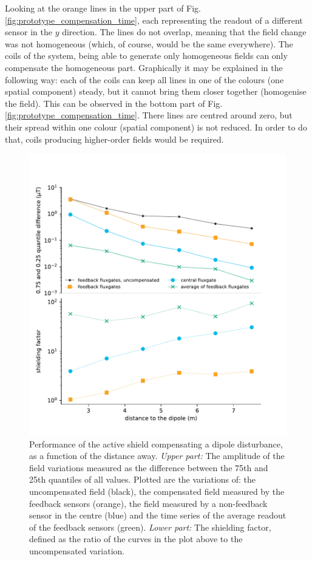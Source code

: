Looking at the orange lines in the upper part of Fig.\,\ref{fig:prototype_compensation_time}, each representing the readout of a different sensor in the $y$ direction.
The lines do not overlap, meaning that the field change was not homogeneous (which, of course, would be the same everywhere).
The coils of the system, being able to generate only homogeneous fields can only compensate the homogeneous part.
Graphically it may be explained in the following way: each of the coils can keep all lines in one of the colours (one spatial component) steady, but it cannot bring them closer together (homogenise the field).
This can be observed in the bottom part of Fig.\,\ref{fig:prototype_compensation_time}.
There lines are centred around zero, but their spread within one colour (spatial component) is not reduced.
In order to do that, coils producing higher-order fields would be required.

\begin{figure}
  \centering
  \includegraphics[width=\linewidth]{gfx/prototype/big_magnet_performance_shielding_factor.pdf}
  \caption{Performance of the active shield compensating a dipole disturbance, as a function of the distance away.
  \emph{Upper part:} The amplitude of the field variations measured as the difference between the 75th and 25th quantiles of all values.
  Plotted are the variations of: the uncompensated field (black), the compensated field measured by the feedback sensors (orange), the field measured by a non-feedback sensor in the centre (blue) and the time series of the average readout of the feedback sensors (green).
  \emph{Lower part:} The shielding factor, defined as the ratio of the curves in the plot above to the uncompensated variation.}\label{fig:prototype_compensation}
\end{figure}

